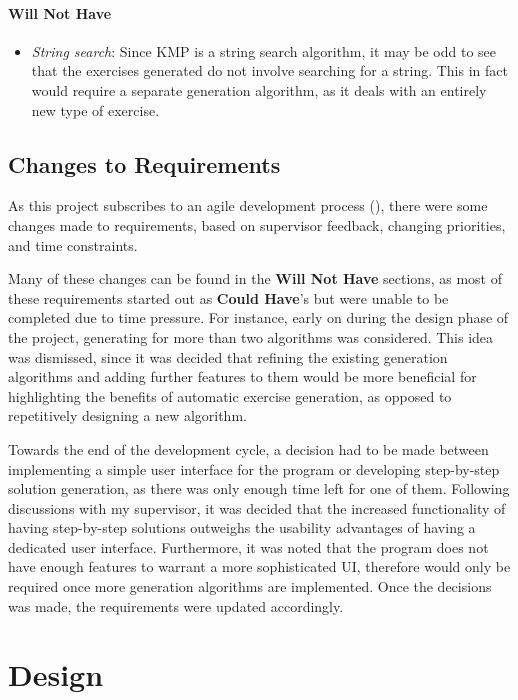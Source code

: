 \documentclass{l4proj}
\begin{document}
\subsubsection{Will Not Have}
\begin{itemize}
	\item
	\emph{String search}: Since KMP is a string search algorithm, it may be odd to see that the exercises generated do not involve searching for a string. This in fact would require a separate generation algorithm, as it deals with an entirely new type of exercise.
\end{itemize}
\section{Changes to Requirements}

As this project subscribes to an agile development process (\cite{}), there were some changes made to requirements, based on supervisor feedback, changing priorities, and time constraints.

Many of these changes can be found in the \textbf{Will Not Have} sections, as most of these requirements started out as \textbf{Could Have}'s but were unable to be completed due to time pressure. For instance, early on during the design phase of the project, generating for more than two algorithms was considered. This idea was dismissed, since it was decided that refining the existing generation algorithms and adding further features to them would be more beneficial for highlighting the benefits of automatic exercise generation, as opposed to repetitively designing a new algorithm. 

Towards the end of the development cycle, a decision had to be made between implementing a simple user interface for the program or developing step-by-step solution generation, as there was only enough time left for one of them. Following discussions with my supervisor, it was decided that the increased functionality of having step-by-step solutions outweighs the usability advantages of having a dedicated user interface. Furthermore, it was noted that the program does not have enough features to warrant a more sophisticated UI, therefore would only be required once more generation algorithms are implemented. Once the decisions was made, the requirements were updated accordingly.


\chapter{Design}
\label{chap:des}
\end{document}
